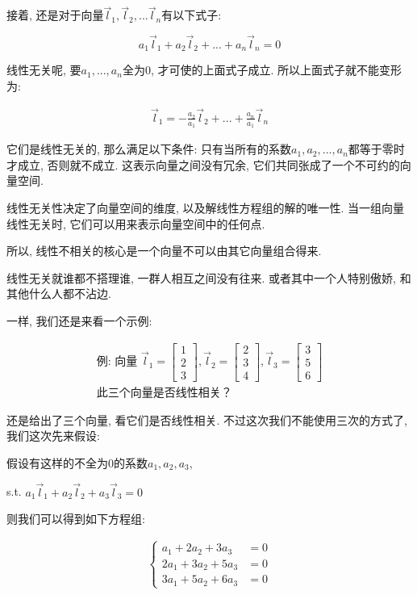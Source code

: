 接着, 还是对于向量\(\vec l_1, \vec l_2, ... \vec l_n\)有以下式子: 

\[a_1 \vec l_1 + a_2 \vec l_2 + ... + a_n \vec l_n = 0\]

线性无关呢, 要$a_1, ..., a_n$全为0, 才可使的上面式子成立. 所以上面式子就不能变形为: 

\begin{align*}
  \vec l_1 = -\frac{a_2}{a_1} \vec l_2 + ... + \frac{a_n}{a_1} \vec l_n
\end{align*}

它们是线性无关的, 那么满足以下条件: 只有当所有的系数$a_1, a_2, ..., a_n$都等于零时才成立, 否则就不成立. 这表示向量之间没有冗余, 它们共同张成了一个不可约的向量空间. 

线性无关性决定了向量空间的维度, 以及解线性方程组的解的唯一性. 当一组向量线性无关时, 它们可以用来表示向量空间中的任何点. 

所以, 线性不相关的核心是一个向量不可以由其它向量组合得来. 

线性无关就谁都不搭理谁, 一群人相互之间没有往来. 或者其中一个人特别傲娇, 和其他什么人都不沾边. 

一样, 我们还是来看一个示例: 

\begin{align*}
  \mbox{例: 向量 }\vec l_1 = \begin{bmatrix} 1 \\ 2 \\ 3  \end{bmatrix}, \vec l_2 = \begin{bmatrix} 2 \\ 3 \\ 4 \end{bmatrix}, \vec l_3 =  \begin{bmatrix} 3 \\ 5 \\ 6  \end{bmatrix} \\
  \mbox{此三个向量是否线性相关？}
\end{align*}

还是给出了三个向量, 看它们是否线性相关. 不过这次我们不能使用三次的方式了, 我们这次先来假设: 

假设有这样的不全为0的系数$a_1, a_2, a_3$, 

s.t. \(a_1 \vec l_1 + a_2 \vec l_2 + a_3 \vec l_3 = 0\)

则我们可以得到如下方程组: 

\begin{align*}
\begin{cases}
  a_1 + 2a_2 + 3a_3 & = 0 \\
  2a_1 + 3a_2 + 5a_3 & = 0 \\
  3a_1 + 5a_2 + 6a_3 & = 0
\end{cases}
\end{align*}

